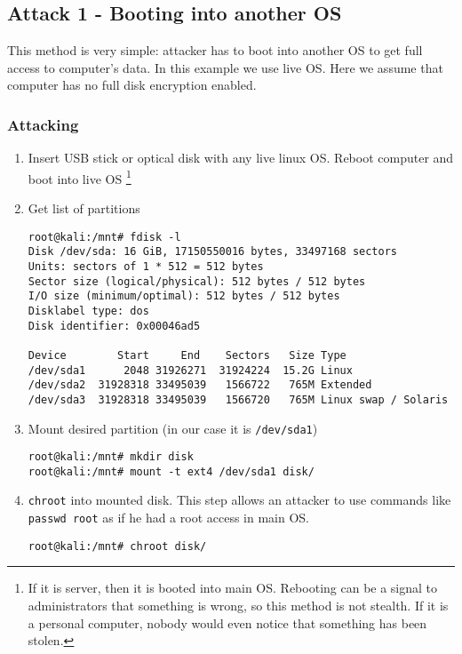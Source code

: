 \subsection{Attack 1 - Booting into another OS}\label{a1}
This method is very simple: attacker has to boot into another OS to get full access to computer's data. In this example we use live OS. Here we assume that computer has no full disk encryption enabled.


\subsubsection*{Attacking}
\begin{enumerate}
    \item Insert USB stick or optical disk with any live linux OS. Reboot computer and boot into live OS \footnote{If it is server, then it is booted into main OS. Rebooting can be a signal to administrators that something is wrong, so this method is not stealth. If it is a personal computer, nobody would even notice that something has been stolen.}
    
    \item Get list of partitions \label{root-start}
\begin{verbatim}
root@kali:/mnt# fdisk -l
Disk /dev/sda: 16 GiB, 17150550016 bytes, 33497168 sectors
Units: sectors of 1 * 512 = 512 bytes
Sector size (logical/physical): 512 bytes / 512 bytes
I/O size (minimum/optimal): 512 bytes / 512 bytes
Disklabel type: dos
Disk identifier: 0x00046ad5

Device        Start     End    Sectors   Size Type
/dev/sda1      2048 31926271  31924224  15.2G Linux
/dev/sda2  31928318 33495039   1566722   765M Extended
/dev/sda3  31928318 33495039   1566720   765M Linux swap / Solaris
\end{verbatim}

    \item Mount desired partition (in our case it is \texttt{/dev/sda1})
    \begin{verbatim}
root@kali:/mnt# mkdir disk
root@kali:/mnt# mount -t ext4 /dev/sda1 disk/
\end{verbatim}

    \item \texttt{chroot} into mounted disk. This step allows an attacker to use commands like \texttt{passwd root} as if he had a root access in main OS. \label{root-end}
    
\begin{verbatim}
root@kali:/mnt# chroot disk/
\end{verbatim}
\end{enumerate}

